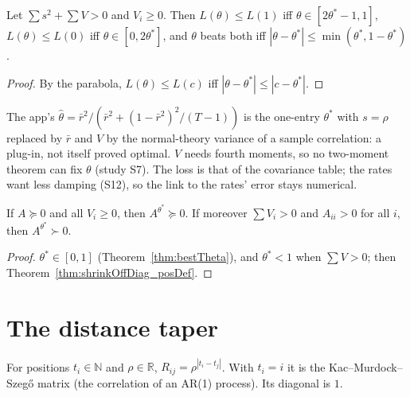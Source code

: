 \begin{theorem}\label{thm:dampSafe}
  \leanok
  Let $\sum s^2 + \sum V > 0$ and $V_i \ge 0$. Then $L(\theta) \le L(1)$ iff
  $\theta \in [2\theta^* - 1, 1]$, $L(\theta) \le L(0)$ iff $\theta \in [0, 2\theta^*]$, and
  $\theta$ beats both iff $|\theta - \theta^*| \le \min(\theta^*, 1 - \theta^*)$.
\end{theorem}
\begin{proof}
  \leanok
  By the parabola, $L(\theta) \le L(c)$ iff $|\theta - \theta^*| \le |c - \theta^*|$.
\end{proof}

\begin{remark}\label{rem:dampRule}
  The app's $\hat\theta = \bar r^2/(\bar r^2 + (1 - \bar r^2)^2/(T-1))$ is the one-entry
  $\theta^*$ with $s = \rho$ replaced by $\bar r$ and $V$ by the normal-theory variance of a
  sample correlation: a plug-in, not itself proved optimal. $V$ needs fourth moments, so no
  two-moment theorem can fix $\theta$ (study S7). The loss is that of the covariance table;
  the rates want less damping (S12), so the link to the rates' error stays numerical.
\end{remark}

\begin{corollary}\label{cor:shrinkOffDiag_bestTheta}
  \leanok
  If $A \succeq 0$ and all $V_i \ge 0$, then $A^{\theta^*} \succeq 0$. If moreover
  $\sum V_i > 0$ and $A_{ii} > 0$ for all $i$, then $A^{\theta^*} \succ 0$.
\end{corollary}
\begin{proof}
  \leanok
  $\theta^* \in [0, 1]$ (Theorem~\ref{thm:bestTheta}), and $\theta^* < 1$ when $\sum V > 0$;
  then Theorem~\ref{thm:shrinkOffDiag_posDef}.
\end{proof}

\section{The distance taper}

\begin{definition}\label{def:distTaper}
  \leanok
  For positions $t_i \in \mathbb N$ and $\rho\in\mathbb R$,
  $R_{ij} = \rho^{|t_i - t_j|}$. With $t_i = i$ it is the Kac--Murdock--Szeg\H{o}
  matrix (the correlation of an AR(1) process). Its diagonal is $1$.
\end{definition}

